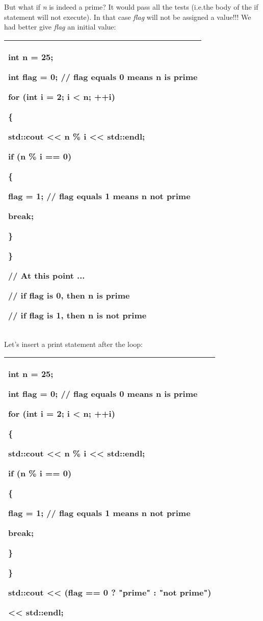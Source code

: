 \documentclass[
]{article}
\begin{document}
But what if \emph{n} is indeed a prime? It would pass all the tests
(i.e.the body of the if statement will not execute). In that case
\emph{flag} will not be assigned a value!!! We had better give
\emph{flag} an initial value:

\begin{longtable}[]{@{}l@{}}
\toprule
\endhead
\begin{minipage}[t]{0.97\columnwidth}\raggedright
int n = 25;

int flag = 0; // flag equals 0 means n is prime

for (int i = 2; i \textless{} n; ++i)

\{

std::cout \textless\textless{} n \% i \textless\textless{} std::endl;

if (n \% i == 0)

\{

flag = 1; // flag equals 1 means n not prime

break;

\}

\}

// At this point ...

// if flag is 0, then n is prime

// if flag is 1, then n is not prime\strut
\end{minipage}\tabularnewline
\bottomrule
\end{longtable}

Let's insert a print statement after the loop:

\begin{longtable}[]{@{}l@{}}
\toprule
\endhead
\begin{minipage}[t]{0.97\columnwidth}\raggedright
int n = 25;

int flag = 0; // flag equals 0 means n is prime

for (int i = 2; i \textless{} n; ++i)

\{

std::cout \textless\textless{} n \% i \textless\textless{} std::endl;

if (n \% i == 0)

\{

flag = 1; // flag equals 1 means n not prime

break;

\}

\}

std::cout \textless\textless{} (flag == 0 ? "prime" : "not prime")

\textless\textless{} std::endl;\strut
\end{minipage}\tabularnewline
\bottomrule
\end{longtable}
\end{document}
